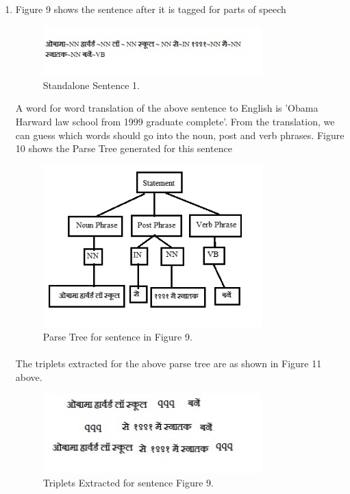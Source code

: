 \begin{enumerate}
\item  Figure 9 shows the sentence after it is tagged for parts of speech

\begin{figure}[htb]
\centering
\includegraphics[width=0.8\textwidth]{images/sentence_testcase1.jpg}
\caption{Standalone Sentence 1.} 
\label{fig:sentence_testcase1}
\end{figure}

A word for word translation of the above sentence to English is 'Obama Harward law school from 1999 graduate complete'. From the translation, we can guess which words should go into the noun, post and verb phrases. Figure 10 shows the Parse Tree generated for this sentence 

\begin{figure}[htb]
\centering
\includegraphics[width=0.8\textwidth]{images/standalone_testcase.jpg}
\caption{Parse Tree for sentence in Figure 9.} 
\label{fig:standalone_testcase}
\end{figure}

\paragraph{}
The triplets extracted for the above parse tree are as shown in Figure 11 above.

\begin{figure}[htb]
\centering
\includegraphics[width=0.8\textwidth]{images/triplet_standalone.jpg}
\caption{Triplets Extracted for sentence Figure 9.} 
\label{fig:triplet_standalone}
\end{figure}


\end{enumerate}
